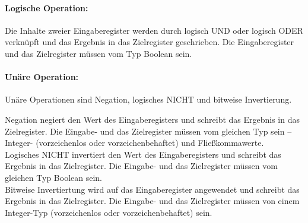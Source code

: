 \documentclass[twoside,a4paper,fleqn,12pt]{book}
\begin{document}


\paragraph{Logische Operation:} Die Inhalte zweier Eingaberegister werden durch logisch UND oder logisch ODER verknüpft und das Ergebnis in das Zielregister geschrieben.
Die Eingaberegister und das Zielregister müssen vom Typ Boolean sein.



\paragraph{Unäre Operation:} Unäre Operationen sind Negation, logisches NICHT und bitweise Invertierung.

Negation negiert den Wert des Eingaberegisters und schreibt das Ergebnis in das Zielregister.
Die Eingabe- und das Zielregister müssen vom gleichen Typ sein -- Integer- (vorzeichenlos oder vorzeichenbehaftet) und Fließkommawerte.\\
Logisches NICHT invertiert den Wert des Eingaberegisters und schreibt das Ergebnis in das Zielregister.
Die Eingabe- und das Zielregister müssen vom gleichen Typ Boolean sein.\\
Bitweise Invertiertung wird auf das Eingaberegister angewendet und schreibt das Ergebnis in das Zielregister.
Die Eingabe- und das Zielregister müssen von einem Integer-Typ (vorzeichenlos oder vorzeichenbehaftet) sein.

\end{document}
